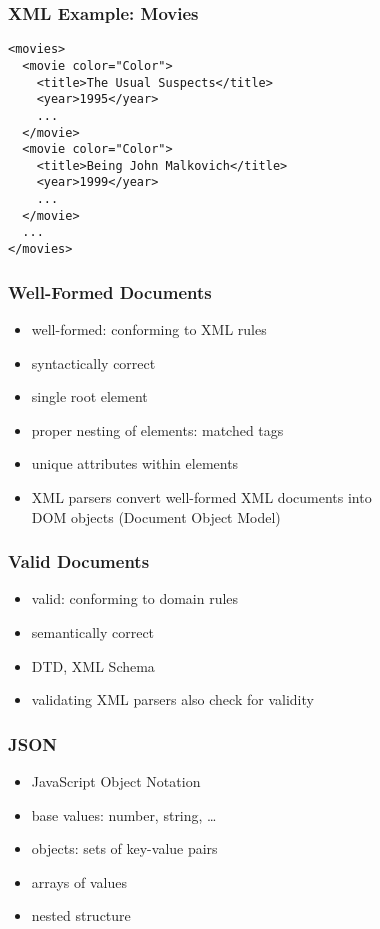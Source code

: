 \documentclass[dvipsnames]{beamer}
\theoremstyle{plain}
\begin{document}
\begin{frame}[fragile]
  \frametitle{XML Example: Movies}

  \begin{lstlisting}
<movies>
  <movie color="Color">
    <title>The Usual Suspects</title>
    <year>1995</year>
    ...
  </movie>
  <movie color="Color">
    <title>Being John Malkovich</title>
    <year>1999</year>
    ...
  </movie>
  ...
</movies>
  \end{lstlisting}
\end{frame}

\begin{frame}
  \frametitle{Well-Formed Documents}

  \begin{itemize}
    \item \alert{well-formed}: conforming to XML rules
    \item syntactically correct

    \medskip
    \item single root element
    \item proper nesting of elements: matched tags
    \item unique attributes within elements

    \pause
    \medskip
    \item XML parsers convert well-formed XML documents into\\
      \alert{DOM} objects (Document Object Model)
  \end{itemize}
\end{frame}

\begin{frame}
  \frametitle{Valid Documents}

  \begin{itemize}
    \item \alert{valid}: conforming to domain rules
    \item semantically correct

    \medskip
    \item DTD, XML Schema

    \pause
    \medskip
    \item validating XML parsers also check for validity
  \end{itemize}
\end{frame}

\lstset{language=Python}

\begin{frame}
  \frametitle{JSON}

  \begin{itemize}
    \item JavaScript Object Notation

    \medskip
    \item base values: number, string, \ldots
    \item objects: sets of key-value pairs
    \item arrays of values

    \medskip
    \item nested structure
  \end{itemize}
\end{frame}
\end{document}
